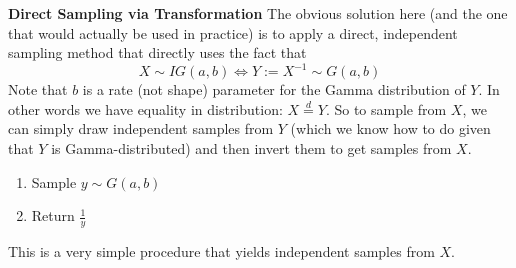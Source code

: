 \documentclass[12pt]{article}
\begin{document}
\noindent
\textbf{Direct Sampling via Transformation}
The obvious solution here (and the one that would actually be used in practice) is to apply a direct, independent sampling method that directly uses the fact that 
\[X \sim IG(a, b) \iff Y := X^{-1} \sim G(a, b) \]
Note that $b$ is a rate (not shape)  parameter for the Gamma distribution of $Y$. In other words we have equality in distribution: $X \overset{d}{=} Y$. So to sample 
from $X$, we can simply draw independent samples from $Y$ (which we know how to do given that $Y$ is Gamma-distributed) and then invert them to get 
samples from $X$. 
\begin{enumerate}
\item Sample $y \sim G(a, b)$
\item Return $\frac{1}{y}$
\end{enumerate} 
This is a very simple procedure that yields independent samples from $X$. 
\end{document}
